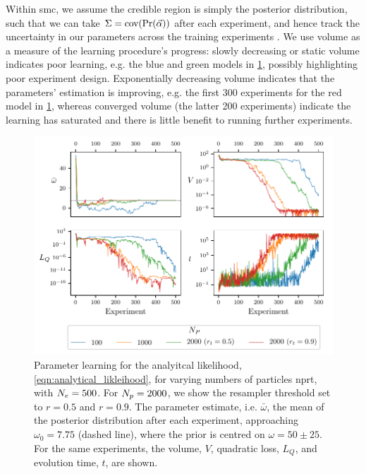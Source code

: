 Within \gls{smc}, we assume the credible region is simply the posterior distribution, 
    such that we can take $\Sigma = \textrm{cov}(\Pr(\vec{\alpha}))$ after each experiment, 
    and hence track the uncertainty in our parameters across the training \glspl{experiment} \cite{Granade:2012kj}.
We use \gls{volume} as a measure of the learning procedure's progress: 
    slowly decreasing or static \gls{volume} indicates poor learning, e.g. the blue and green models in \cref{fig:param_learning_vary_particles}, 
    possibly highlighting poor \gls{experiment} design.
Exponentially decreasing \gls{volume} indicates that the parameters' estimation is improving,
    e.g. the first 300 \glspl{experiment} for the red model in \cref{fig:param_learning_vary_particles},
    whereas converged \gls{volume} (the latter 200 \glspl{experiment})
    indicate the learning has saturated and there is little benefit to running further \glspl{experiment}.     

\begin{figure}[t]
    \centering
    \includegraphics{algorithms/figures/params.pdf}
    \caption[Parameter learning with varying number of particles]{
        Parameter learning for the analyitcal \gls{likelihood}, \cref{eqn:analytical_likleihood},
        for varying numbers of \glspl{particle} \gls{nprt}, with $N_e=500$. 
        For $N_p=2000$, we show the resampler threshold set to $r=0.5$ and $r=0.9$. 
        The parameter estimate, i.e. $\bar{\omega}$, the mean of the posterior distribution after each experiment, 
        approaching $\omega_0=7.75$ (dashed line), where the prior is centred on $\omega=50 \pm 25$. 
        For the same experiments, the volume, $V$, quadratic loss, $L_Q$, 
        and evolution time, $t$, are shown.
        \figtableref
    }
    \label{fig:param_learning_vary_particles}
\end{figure}


